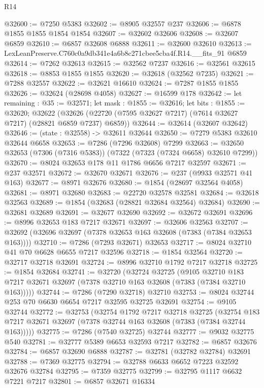\begin{lexlean}{R14}
\begin{coremodule}
@32600 := @7250 @5383
@32602 := @8905 @32557 @237
@32606 := @6878 @1855 @1855 @1854 @1854
@32607 := @32602 @32606
@32608 := @32607 @6859
@32610 := @6857 @32608 @6888
@32611 := @32600 @32610
@32613 := LexLeanPreserve.C760c0a9db341e4a6b8c271cbee5cba4f.R14.__fits_91 @6859
@32614 := @7262 @32613
@32615 := @32562 @7237
@32616 := @32561 @32615
@32618 := @8853 @1855 @1855
@32620 := @32618 (@32562 @7235)
@32621 := @7288 @32557
@32622 := @32621 @16610
@32624 := @7287 @1855 @1855
@32626 := @32624 (@28698 @4058)
@32627 := @16599 @178
@32642 := let remaining : @35 := @32571;
  let mask : @1855 := @32616;
  let bits : @1855 := @32620;
  @32622 (@32626 (@22720 (@7595 @32627 @7217) (@7614 @32627 @7217) (@28821 @6859 @7237) @6859))
@32644 := @32614 (@32607 @32642)
@32646 := (state : @32558) -> @32611 @32644
@32650 := @7279 @5383 @32610 @32644 @6658
@32653 := @7286 (@7296 @32608) @7299
@32663 := @32650 @32653 (@7306 (@7316 @5383)) (@7322 (@7323 (@7324 @6658) @32610 @7299))
@32670 := @8024 @32653 @178 @11 @1786 @6656 @7217 @32597
@32671 := @237 @32571
@32672 := @32670 @32671
@32676 := @237 (@9933 @32571 @41 @163)
@32677 := @8971 @32676
@32680 := @1854 (@28697 @32564 @4058)
@32681 := @8971 @32680
@32683 := @22720 @32578 @32581
@32684 := @32618 @32563
@32689 := @1854 (@32683 (@28821 @32684 @32564) @32684)
@32690 := @32681 @32689
@32691 := @32677 @32690
@32692 := @32672 @32691
@32696 := @8996 @32653 @183 @7217 @32671
@32697 := @32606 @32563
@32707 := @32692 (@32696 @32697 (@7378 @32653 @163 @32608 (@7383 (@7384 @32653 @163))))
@32710 := @7286 (@7293 @32671) @32653
@32717 := @8024 @32710 @41 @70 @6628 @6655 @7217 @32596
@32718 := @1854 @32564
@32720 := @32717 @32718 @32691
@32724 := @8996 @32710 @1792 @7217 @32718
@32725 := @1854 @32684
@32741 := @32720
    (@32724
      @32725
      (@9105
        @32710
        @183
        @7217
        @32671
        @32697
        (@7378 @32710 @163 @32608 (@7383 (@7384 @32710 @163)))))
@32744 := @7286 (@7290 @32718) @32710
@32753 := @8024 @32744 @253 @70 @6630 @6654 @7217 @32595 @32725 @32691
@32754 := @9105 @32744
@32772 := @32753
    (@32754
      @1792
      @7217
      @32718
      @32725
      (@32754 @183 @7217 @32671 @32697 (@7378 @32744 @163 @32608 (@7383 (@7384 @32744 @163)))))
@32775 := @7286 (@7540 @32725) @32744
@32777 := @9032 @32775 @540
@32781 := @32777 @5389 @6653 @32593 @7217
@32782 := @6857 @32676
@32784 := @6857 @32690 @6888
@32787 := @32781 (@32782 @32784) @32691
@32788 := @7369 @32775
@32794 := @32788 @6633 @6652 @7223 @32592 @32676 @32784
@32795 := @7359 @32775
@32799 := @32795 @1117 @6632 @7221 @7217
@32801 := @6857 @32671 @16334

\end{coremodule}
\end{lexlean}

